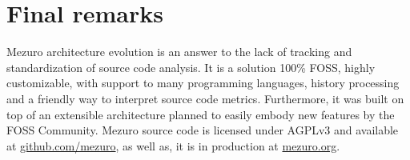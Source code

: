 \section{Final remarks}

Mezuro architecture evolution is an answer to the lack of tracking and
standardization of source code analysis. It is a solution 100\% FOSS, highly
customizable, with support to many programming languages, history processing
and a friendly way to interpret source code metrics. Furthermore, it was built
on top of an extensible architecture planned to easily embody new features by
the FOSS Community. Mezuro source code is licensed under AGPLv3 and available at
\url{github.com/mezuro}, as well as, it is in production at \url{mezuro.org}.

